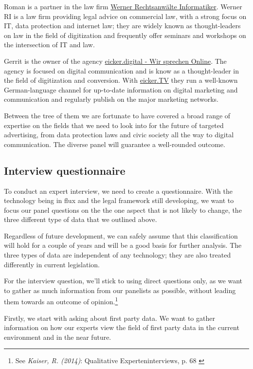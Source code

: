 Roman is a partner in the law firm \href{https://www.werner-ri.de/}{Werner Rechtsanwälte Informatiker}. Werner RI is a law firm providing legal advice on commercial law, with a strong focus on IT, data protection and internet law; they are widely known as thought-leaders on law in the field of digitization and frequently offer seminars and workshops on the intersection of IT and law.

Gerrit is the owner of the agency \href{https://eicker.digital/}{eicker.digital - Wir sprechen Online}. The agency is focused on digital communication and is know as a thought-leader in the field of digitization and conversion. With \href{https://www.youtube.com/eickertv}{eicker.TV} they run a well-known German-language channel for up-to-date information on digital marketing and communication and regularly publish on the major marketing networks.

Between the tree of them we are fortunate to have covered a broad range of expertise on the fields that we need to look into for the future of targeted advertising, from data protection laws and civic society all the way to digital communication. The diverse panel will guarantee a well-rounded outcome.

\subsection{Interview questionnaire}

To conduct an expert interview, we need to create a questionnaire. With the technology being in flux and the legal framework still developing, we want to focus our panel questions on the the one aspect that is not likely to change, the three different type of data that we outlined above.

Regardless of future development, we can safely assume that this classification will hold for a couple of years and will be a good basis for further analysis. The three types of data are independent of any technology; they are also treated differently in current legislation.

For the interview question, we'll stick to using direct questions only, as we want to gather as much information from our panelists as possible, without leading them towards an outcome of opinion.\footnote{See \textit{Kaiser, R. (2014)}: Qualitative Experteninterviews, p. 68 \cite{expertInterviews}} 

Firstly, we start with asking about first party data. We want to gather information on how our experts view the field of first party data in the current environment and in the near future. 

